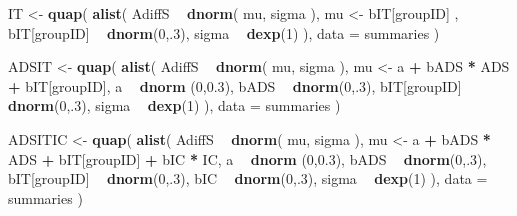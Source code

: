 \documentclass[10pt,dvipsnames,enabledeprecatedfontcommands]{scrartcl}
\newenvironment{Shaded}{\begin{snugshade}}{\end{snugshade}}
\newcommand{\KeywordTok}[1]{\textcolor[rgb]{0.13,0.29,0.53}{\textbf{#1}}}
\newcommand{\DataTypeTok}[1]{\textcolor[rgb]{0.13,0.29,0.53}{#1}}
\newcommand{\DecValTok}[1]{\textcolor[rgb]{0.00,0.00,0.81}{#1}}
\newcommand{\FloatTok}[1]{\textcolor[rgb]{0.00,0.00,0.81}{#1}}
\newcommand{\StringTok}[1]{\textcolor[rgb]{0.31,0.60,0.02}{#1}}
\newcommand{\OperatorTok}[1]{\textcolor[rgb]{0.81,0.36,0.00}{\textbf{#1}}}
\newcommand{\NormalTok}[1]{#1}
\begin{document}
\begin{Shaded}
\begin{Highlighting}[]
\NormalTok{IT <-}\StringTok{ }\KeywordTok{quap}\NormalTok{(}
  \KeywordTok{alist}\NormalTok{(}
\NormalTok{    AdiffS }\OperatorTok{~}\StringTok{ }\KeywordTok{dnorm}\NormalTok{( mu, sigma ),}
\NormalTok{    mu <-}\StringTok{  }\NormalTok{bIT[groupID] ,}
\NormalTok{    bIT[groupID] }\OperatorTok{~}\StringTok{ }\KeywordTok{dnorm}\NormalTok{(}\DecValTok{0}\NormalTok{,.}\DecValTok{3}\NormalTok{),}
\NormalTok{    sigma  }\OperatorTok{~}\StringTok{ }\KeywordTok{dexp}\NormalTok{(}\DecValTok{1}\NormalTok{)}
\NormalTok{  ), }
  \DataTypeTok{data =}\NormalTok{ summaries}
\NormalTok{)}


\NormalTok{ADSIT <-}\StringTok{ }\KeywordTok{quap}\NormalTok{(}
  \KeywordTok{alist}\NormalTok{(}
\NormalTok{    AdiffS }\OperatorTok{~}\StringTok{ }\KeywordTok{dnorm}\NormalTok{( mu, sigma ),}
\NormalTok{    mu <-}\StringTok{ }\NormalTok{a }\OperatorTok{+}\StringTok{ }\NormalTok{bADS }\OperatorTok{*}\StringTok{ }\NormalTok{ADS }\OperatorTok{+}\StringTok{  }\NormalTok{bIT[groupID],}
\NormalTok{    a }\OperatorTok{~}\StringTok{ }\KeywordTok{dnorm}\NormalTok{ (}\DecValTok{0}\NormalTok{,}\FloatTok{0.3}\NormalTok{),}
\NormalTok{    bADS }\OperatorTok{~}\StringTok{ }\KeywordTok{dnorm}\NormalTok{(}\DecValTok{0}\NormalTok{,.}\DecValTok{3}\NormalTok{),}
\NormalTok{    bIT[groupID] }\OperatorTok{~}\StringTok{ }\KeywordTok{dnorm}\NormalTok{(}\DecValTok{0}\NormalTok{,.}\DecValTok{3}\NormalTok{),}
\NormalTok{    sigma  }\OperatorTok{~}\StringTok{ }\KeywordTok{dexp}\NormalTok{(}\DecValTok{1}\NormalTok{)}
\NormalTok{  ), }
  \DataTypeTok{data =}\NormalTok{ summaries}
\NormalTok{)}


\NormalTok{ADSITIC <-}\StringTok{ }\KeywordTok{quap}\NormalTok{(}
  \KeywordTok{alist}\NormalTok{(}
\NormalTok{    AdiffS }\OperatorTok{~}\StringTok{ }\KeywordTok{dnorm}\NormalTok{( mu, sigma ),}
\NormalTok{    mu <-}\StringTok{ }\NormalTok{a }\OperatorTok{+}\StringTok{ }\NormalTok{bADS }\OperatorTok{*}\StringTok{ }\NormalTok{ADS }\OperatorTok{+}\StringTok{  }\NormalTok{bIT[groupID] }\OperatorTok{+}\StringTok{ }\NormalTok{bIC }\OperatorTok{*}\StringTok{ }\NormalTok{IC,}
\NormalTok{    a }\OperatorTok{~}\StringTok{ }\KeywordTok{dnorm}\NormalTok{ (}\DecValTok{0}\NormalTok{,}\FloatTok{0.3}\NormalTok{),}
\NormalTok{    bADS }\OperatorTok{~}\StringTok{ }\KeywordTok{dnorm}\NormalTok{(}\DecValTok{0}\NormalTok{,.}\DecValTok{3}\NormalTok{),}
\NormalTok{    bIT[groupID] }\OperatorTok{~}\StringTok{ }\KeywordTok{dnorm}\NormalTok{(}\DecValTok{0}\NormalTok{,.}\DecValTok{3}\NormalTok{),}
\NormalTok{    bIC }\OperatorTok{~}\StringTok{ }\KeywordTok{dnorm}\NormalTok{(}\DecValTok{0}\NormalTok{,.}\DecValTok{3}\NormalTok{),}
\NormalTok{    sigma  }\OperatorTok{~}\StringTok{ }\KeywordTok{dexp}\NormalTok{(}\DecValTok{1}\NormalTok{)}
\NormalTok{  ), }
  \DataTypeTok{data =}\NormalTok{ summaries}
\NormalTok{)}



\end{Highlighting}
\end{Shaded}
\end{document}
